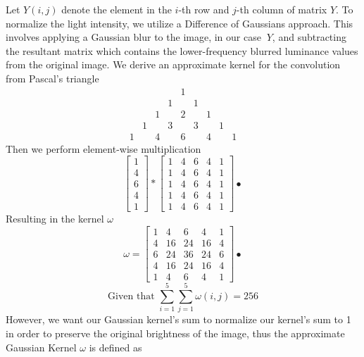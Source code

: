 \documentclass[12pt]{article}
\begin{document}
Let \( Y(i, j) \) denote the element in the \( i \)-th row and \( j \)-th column of matrix \( Y \). To normalize the light intensity, we utilize a Difference of Gaussians approach. This involves applying a Gaussian blur to the image, in our case \(\ Y \), and subtracting the resultant matrix which contains the lower-frequency blurred luminance values from the original image. We derive an approximate kernel for the convolution from Pascal's triangle
\[
\begin{array}{ccccccccccccccc}
&&&&&&& 1 &&&&&&& \\
&&&&&& 1 && 1 &&&&&& \\
&&&&& 1 && 2 && 1 &&&&& \\
&&&& 1 && 3 && 3 && 1 &&&& \\
&&& 1 && 4 && 6 && 4 && 1 &&& 
\end{array}
\]
Then we perform element-wise multiplication
\begin{equation}
\begin{bmatrix}
1\\
4\\
6\\
4\\
1
\end{bmatrix} *
\begin{bmatrix}
1 & 4 & 6 & 4 & 1\\
1 & 4 & 6 & 4 & 1\\
1 & 4 & 6 & 4 & 1\\
1 & 4 & 6 & 4 & 1\\
1 & 4 & 6 & 4 & 1
\end{bmatrix}•
\end{equation}
Resulting in the kernel \(\omega \)
\begin{equation}
\omega = 
\begin{bmatrix}
1 & 4 & 6 & 4 & 1 \\
4 & 16 & 24 & 16 & 4 \\
6 & 24 & 36 & 24 & 6 \\
4 & 16 & 24 & 16 & 4 \\
1 & 4 & 6 & 4 & 1
\end{bmatrix}•
\end{equation}
\begin{equation}
\text{Given that }\sum_{i=1}^{5}\sum_{j=1}^{5}\omega(i, j) = 256
\end{equation}
However, we want our Gaussian kernel's sum to normalize our kernel's sum to 1 in order to preserve the original brightness of the image, thus the approximate Gaussian Kernel \( \omega \) is defined as
\end{document}
